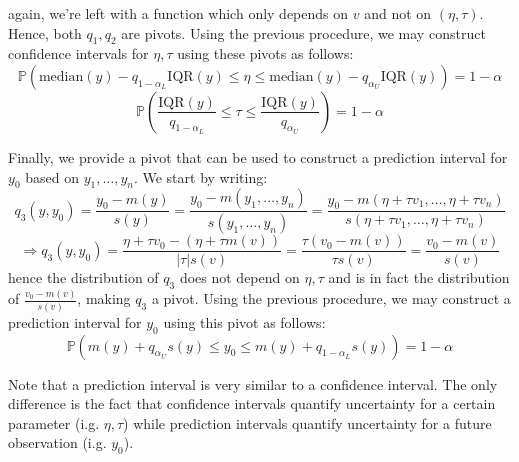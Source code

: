 again, we're left with a function which only depends on $v$ and not on $(\eta,\tau)$. Hence, both $q_1, q_2$ are pivots. Using the previous procedure, we may construct confidence intervals for $\eta, \tau$ using these pivots as follows:
$$\mathbb{P}\left(\text{median}(y) - q_{1-\alpha_L} \text{IQR}(y) \leq \eta \leq \text{median}(y) - q_{\alpha_U} \text{IQR}(y)\right) = 1 - \alpha$$
$$\mathbb{P}\left(\frac{\text{IQR}(y)}{q_{1-\alpha_L}} \leq \tau \leq \frac{\text{IQR}(y)}{q_{\alpha_U}}\right) = 1 - \alpha$$

\vspace{0.2cm}

Finally, we provide a pivot that can be used to construct a prediction interval for $y_0$ based on $y_1, \ldots, y_n$. We start by writing:
$$q_3(y, y_0) = \frac{y_0 - m(y)}{s(y)} = \frac{y_0 - m(y_1, \ldots, y_n)}{s(y_1, \ldots, y_n)} = \frac{y_0 - m(\eta + \tau v_1, \ldots, \eta + \tau v_n)}{s(\eta + \tau v_1, \ldots, \eta + \tau v_n)}$$
$$\Rightarrow q_3(y, y_0) = \frac{\eta + \tau v_0 - (\eta + \tau m(v))}{|\tau| s(v)} = \frac{\tau (v_0 - m(v))}{\tau s(v)} = \frac{v_0 - m(v)}{s(v)}$$
hence the distribution of $q_3$ does not depend on $\eta, \tau$ and is in fact the distribution of $\frac{v_0 - m(v)}{s(v)}$, making $q_3$ a pivot. Using the previous procedure, we may construct a prediction interval for $y_0$ using this pivot as follows:
$$\mathbb{P}\left(m(y) + q_{\alpha_U} s(y) \leq y_0 \leq m(y) + q_{1-\alpha_L} s(y)\right) = 1 - \alpha$$ 

\begin{remark}
    Note that a prediction interval is very similar to a confidence interval. The only difference is the fact that confidence intervals quantify uncertainty for a certain parameter (i.g. $\eta, \tau$) while prediction intervals quantify uncertainty for a future observation (i.g. $y_0$).
\end{remark}